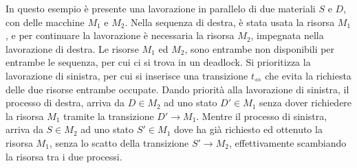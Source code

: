 \documentclass{article}
\numberwithin{equation}{subsection}
\begin{document}
\begin{center}
\end{center}
In questo esempio è presente una lavorazione in parallelo di due materiali $S$ e $D$, con delle macchine $M_1$ e $M_2$. Nella sequenza di destra, è stata 
usata la risorsa $M_1$, e per continuare la lavorazione è necessaria la risorsa $M_2$, impegnata nella 
lavorazione di destra. Le risorse $M_1$ ed $M_2$, sono entrambe non 
disponibili per entrambe le sequenza, per cui ci si trova in un deadlock. Si prioritizza la lavorazione di sinistra, 
per cui si inserisce una transizione $t_{\iff}$ che evita la richiesta delle due risorse entrambe occupate. 
Dando priorità alla lavorazione di sinistra, il processo di destra, arriva da $ D\in M_2$ ad uno stato $ D'\in M_1$ senza dover 
richiedere la risorsa $M_1$ tramite la transizione $ D'\to M_1$. Mentre il processo di sinistra, arriva da $S\in M_2$ ad uno stato $S'\in M_1$ dove ha già 
richiesto ed ottenuto la risorsa $M_1$, senza lo scatto della transizione $S'\to M_2$, effettivamente scambiando la risorsa tra i due processi. 
\end{document}
